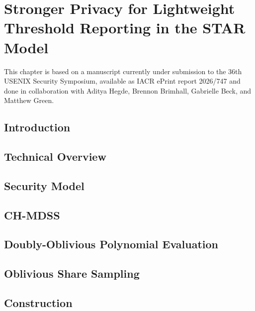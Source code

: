 \chapter{Stronger Privacy for Lightweight Threshold Reporting in the STAR Model}

\begin{singlespace}

	This chapter is based on a manuscript currently under submission to the 36th USENIX Security Symposium, available as IACR ePrint report 2026/747 and done in collaboration with Aditya Hegde, Brennon Brimhall, Gabrielle Beck, and Matthew Green.

\end{singlespace}

\section{Introduction}


\section{Technical Overview}


\section{Security Model}


\section{CH-MDSS}
\label{sec:chmdss}


\section{Doubly-Oblivious Polynomial Evaluation}


\section{Oblivious Share Sampling}


\section{Construction}


